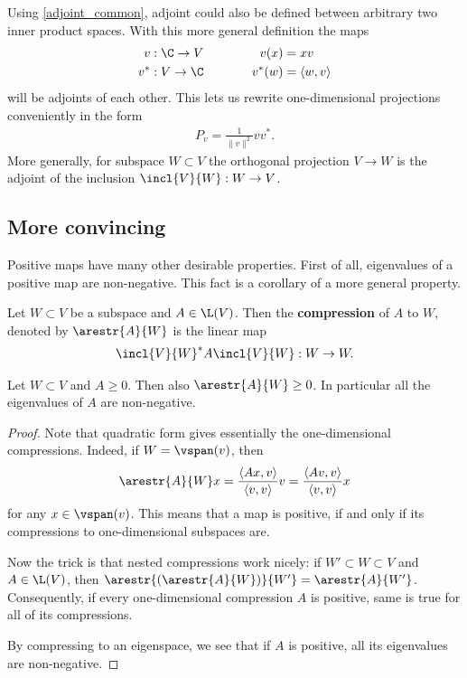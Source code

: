 Using \ref{adjoint_common}, adjoint could also be defined between arbitrary two inner product spaces. With this more general definition the maps
\begin{align*}
	v : \C \to V & \hspace{1cm} & v(x) &= x v \\
	v^{*} : V \to \C & \hspace{1cm} & v^{*}(w) &= \langle w, v \rangle
\end{align*}
will be adjoints of each other. This lets us rewrite one-dimensional projections conveniently in the form
\begin{align*}
	P_{v} = \frac{1}{\|v\|^2} v v^{*}.
\end{align*}
More generally, for subspace $W \subset V$ the orthogonal projection $V \to W$ is the adjoint of the inclusion $\incl{V}{W} : W \to V$.

\subsection{More convincing}

Positive maps have many other desirable properties. First of all, eigenvalues of a positive map are non-negative. This fact is a corollary of a more general property.

\begin{maar}
	Let $W \subset V$ be a subspace and $A \in \L(V)$. Then the \textbf{compression} of $A$ to $W$, denoted by $\arestr{A}{W}$ is the linear map
	\begin{align*}
		\incl{V}{W}^{*} A \incl{V}{W} : W \to W.
	\end{align*}
\end{maar}

\begin{lem}
	Let $W \subset V$ and $A \geq 0$. Then also $\arestr{A}{W} \geq 0$. In particular all the eigenvalues of $A$ are non-negative.
\end{lem}
\begin{proof}
	Note that quadratic form gives essentially the one-dimensional compressions. Indeed, if $W = \vspan(v)$, then
	\begin{align*}
		\arestr{A}{W} x = \frac{\langle A x, v \rangle}{\langle v, v \rangle} v = \frac{\langle A v, v \rangle}{\langle v, v \rangle} x
	\end{align*}
	for any $x \in \vspan(v)$. This means that a map is positive, if and only if its compressions to one-dimensional subspaces are.

	Now the trick is that nested compressions work nicely: if $W' \subset W \subset V$ and $A \in \L(V)$, then $\arestr{(\arestr{A}{W})}{W'} = \arestr{A}{W'}$. Consequently, if every one-dimensional compression $A$ is positive, same is true for all of its compressions.

	By compressing to an eigenspace, we see that if $A$ is positive, all its eigenvalues are non-negative.
\end{proof}

